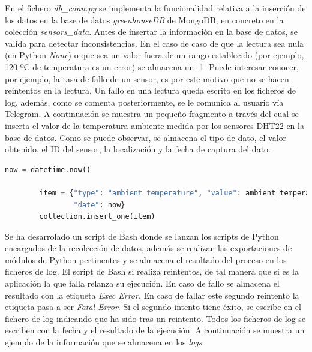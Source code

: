 \documentclass[a4paper, 12pt, oneside]{book}
\begin{document}
En el fichero \textit{db\_conn.py} se implementa la funcionalidad relativa a la inserción de los datos en la base de datos \textit{greenhouseDB} de MongoDB, en concreto en la colección \textit{sensors\_data}. Antes de insertar la información en la base de datos, se valida para detectar inconsistencias. En el caso de caso de que la lectura sea nula (en Python \textit{None}) o que sea un valor fuera de un rango establecido (por ejemplo, 120 ºC de temperatura es un error) se almacena un -1. Puede interesar conocer, por ejemplo, la tasa de fallo de un sensor, es por este motivo que no se hacen reintentos en la lectura. Un fallo en una lectura queda escrito en los ficheros de log, además, como se comenta posteriormente, se le comunica al usuario vía Telegram.
A continuación se muestra un pequeño fragmento a través del cual se inserta el valor de la temperatura ambiente medida por los sensores DHT22 en la base de datos. Como se puede observar, se almacena el tipo de dato, el valor obtenido, el ID del sensor, la localización y la fecha de captura del dato.


\begin{lstlisting}[language=Python]
        now = datetime.now()

        item = {"type": "ambient temperature", "value": ambient_temperature, "sensorID": d.pin, "location": d.location,
                "date": now}
        collection.insert_one(item)
\end{lstlisting}

Se ha desarrolado un script de Bash donde se lanzan los scripts de Python encargados de la recolección de datos, además se realizan las exportaciones de módulos de Python pertinentes y se almacena el resultado del proceso en los ficheros de log. El script de Bash si realiza reintentos, de tal manera que si es la aplicación la que falla relanza su ejecución. En caso de fallo se almacena el resultado con la etiqueta \textit{Exec Error}. En caso de fallar este segundo reintento la etiqueta pasa a ser \textit{Fatal Error}. Si el segundo intento tiene éxito, se escribe en el fichero de log indicando que ha sido tras un reintento. Todos los ficheros de log se escriben con la fecha y el resultado de la ejecución.
A continuación se muestra un ejemplo de la información que se almacena en los \textit{logs}.
\end{document}
